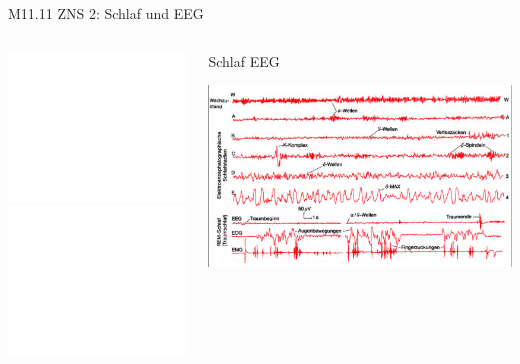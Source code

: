 \documentclass{beamer}
\begin{document}
\begin{frame}{M11.11 ZNS 2: Schlaf und EEG}
    
    \begin{columns}[c]
    \begin{column}{6cm}
    
    \begin{center}
        \includegraphics<1>[width=\textwidth]{formatio_reticularis_1.pdf}
        \includegraphics<2->[width=\textwidth]{formatio_reticularis_2.pdf}
    \end{center}
    
    \pause
    
    
    \end{column}
    
    \begin{column}{5cm}
    
    \pause
    
    \begin{block}{Schlaf EEG}
    
    \begin{center}
        \includegraphics[width=\textwidth]{schlaf_eeg.png}
    \end{center}
    
    \end{block}
    
    \end{column}
    
    
    \end{columns}
    
    
    \pause


\end{frame}
\end{document}
